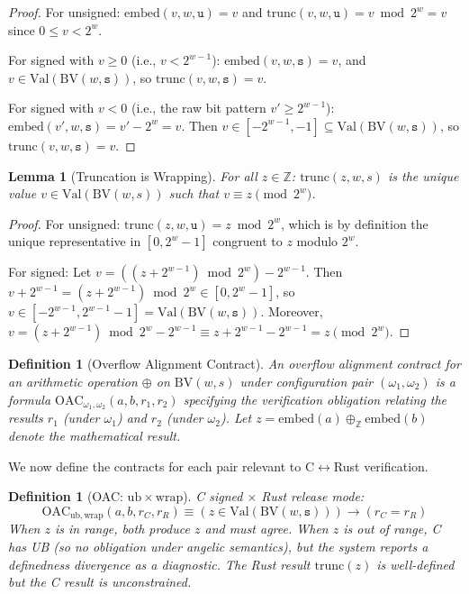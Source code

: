 \documentclass[11pt]{article}
\newtheorem{lemma}[theorem]{Lemma}
\newtheorem{definition}[theorem]{Definition}
\newcommand{\BV}{\mathrm{BV}}
\newcommand{\Val}{\mathrm{Val}}
\newcommand{\trunc}{\mathrm{trunc}}
\newcommand{\embed}{\mathrm{embed}}
\newcommand{\OAC}{\mathrm{OAC}}
\begin{document}
\begin{proof}
For unsigned: $\embed(v, w, \texttt{u}) = v$ and $\trunc(v, w, \texttt{u}) = v \bmod 2^w = v$ since $0 \leq v < 2^w$.

For signed with $v \geq 0$ (i.e., $v < 2^{w-1}$): $\embed(v, w, \texttt{s}) = v$, and $v \in \Val(\BV(w, \texttt{s}))$, so $\trunc(v, w, \texttt{s}) = v$.

For signed with $v < 0$ (i.e., the raw bit pattern $v' \geq 2^{w-1}$): $\embed(v', w, \texttt{s}) = v' - 2^w = v$. Then $v \in [-2^{w-1}, -1] \subseteq \Val(\BV(w, \texttt{s}))$, so $\trunc(v, w, \texttt{s}) = v$.
\end{proof}

\begin{lemma}[Truncation is Wrapping]
\label{lem:trunc-wrap}
For all $z \in \mathbb{Z}$: $\trunc(z, w, s)$ is the unique value $v \in \Val(\BV(w, s))$ such that $v \equiv z \pmod{2^w}$.
\end{lemma}

\begin{proof}
For unsigned: $\trunc(z, w, \texttt{u}) = z \bmod 2^w$, which is by definition the unique representative in $[0, 2^w - 1]$ congruent to $z$ modulo $2^w$.

For signed: Let $v = ((z + 2^{w-1}) \bmod 2^w) - 2^{w-1}$. Then $v + 2^{w-1} = (z + 2^{w-1}) \bmod 2^w \in [0, 2^w - 1]$, so $v \in [-2^{w-1}, 2^{w-1} - 1] = \Val(\BV(w, \texttt{s}))$. Moreover, $v = (z + 2^{w-1}) \bmod 2^w - 2^{w-1} \equiv z + 2^{w-1} - 2^{w-1} = z \pmod{2^w}$.
\end{proof}

\begin{definition}[Overflow Alignment Contract]
\label{def:oac}
An \emph{overflow alignment contract} for an arithmetic operation $\oplus$ on $\BV(w, s)$ under configuration pair $(\omega_1, \omega_2)$ is a formula $\OAC_{\omega_1, \omega_2}(a, b, r_1, r_2)$ specifying the verification obligation relating the results $r_1$ (under $\omega_1$) and $r_2$ (under $\omega_2$). Let $z = \embed(a) \oplus_{\mathbb{Z}} \embed(b)$ denote the mathematical result.
\end{definition}

We now define the contracts for each pair relevant to C$\leftrightarrow$Rust verification.

\begin{definition}[OAC: $\mathrm{ub} \times \mathrm{wrap}$]
\label{def:oac-ub-wrap}
C signed $\times$ Rust release mode:
\[
\OAC_{\mathrm{ub},\mathrm{wrap}}(a, b, r_C, r_R) \equiv \left(z \in \Val(\BV(w, \texttt{s}))\right) \to (r_C = r_R)
\]
When $z$ is in range, both produce $z$ and must agree. When $z$ is out of range, C has UB (so no obligation under angelic semantics), but the system reports a \emph{definedness divergence} as a diagnostic. The Rust result $\trunc(z)$ is well-defined but the C result is unconstrained.
\end{definition}
\end{document}
